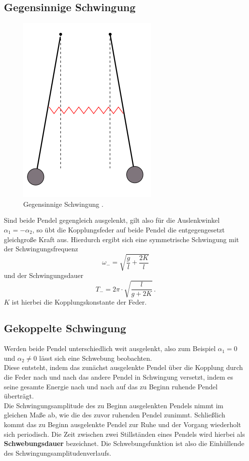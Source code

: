 \subsection{Gegensinnige Schwingung}
\FloatBarrier
\begin{figure}
	\centering
	\includegraphics[width=0.4\linewidth]{Bilder/gegenphasig.png}
	\caption{Gegensinnige Schwingung \cite{Anleitung}.}
	\label{fig:gegen}
\end{figure}
\FloatBarrier
Sind beide Pendel gegengleich ausgelenkt, gilt also für die Auslenkwinkel $\alpha_1=-\alpha_2$, so übt die Kopplungsfeder auf beide Pendel die entgegengesetzt gleichgroße Kraft aus.
Hierdurch ergibt sich eine symmetrische Schwingung mit der Schwingungsfrequenz
\begin{equation}
	\label{eqn:wgegen}
	\omega_{\mathrm{-}}=\sqrt{\frac{g}{l}+\frac{2 K}{l}}
\end{equation}
und der Schwingungsdauer
\begin{equation}
	\label{eqn:tgegen}
	T_{\mathrm{-}}=2\pi\cdot\sqrt{\frac{l}{g+2K}} \, \text{.}
\end{equation}
$K$ ist hierbei die Kopplungskonstante der Feder.
\subsection{Gekoppelte Schwingung}
Werden beide Pendel unterschiedlich weit ausgelenkt, also zum Beispiel $\alpha_1=0$ und $\alpha_2 \neq 0$ lässt sich eine Schwebung beobachten.\\
Diese entsteht, indem das zunächst ausgelenkte Pendel über die Kopplung durch die Feder nach und nach das andere Pendel in Schwingung versetzt, indem es seine gesamte Energie nach und nach auf das zu Beginn ruhende Pendel überträgt.\\
Die Schwingungsamplitude des zu Beginn ausgelenkten Pendels nimmt im gleichen Maße ab, wie die des zuvor ruhenden Pendel zunimmt.
Schließlich kommt das zu Beginn ausgelenkte Pendel zur Ruhe und der Vorgang wiederholt sich periodisch.
Die Zeit zwischen zwei Stillständen eines Pendels wird hierbei als \textbf{Schwebungsdauer} bezeichnet.
Die Schwebungsfunktion ist also die Einhüllende des Schwingungsamplitudenverlaufs.
\FloatBarrier

